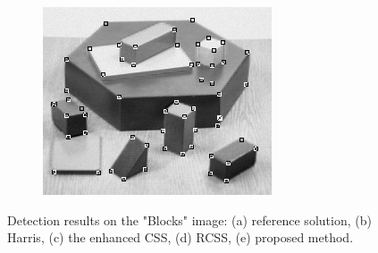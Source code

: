 \documentclass[letterpaper, 10 pt, conference]{ieeeconf}  %
\begin{document}
\begin{figure}[htbp]
\begin{subfigure}[b]{0.49\linewidth}
      \includegraphics[width=\linewidth]{experiments/blocks_final.png}
      \caption{}
    \end{subfigure}

      	\caption{Detection results on the "Blocks" image: (a) reference solution, (b) Harris, (c) the enhanced CSS, (d) RCSS, (e) proposed method.}
  	\label{Results on Blocks image}
	\end{figure}
\end{document}
